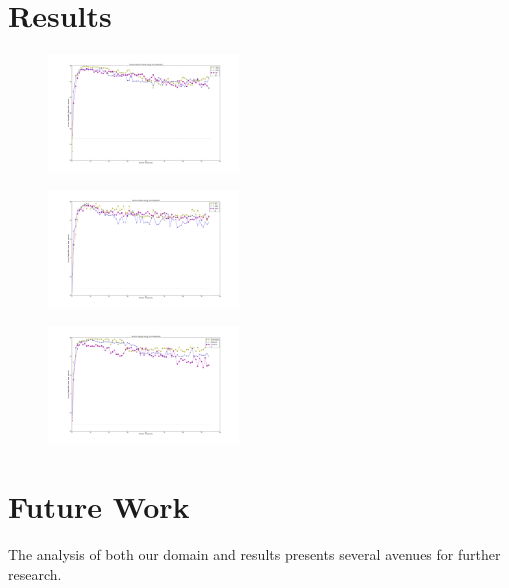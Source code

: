 \documentclass[letterpaper, 10 pt, conference]{ieeeconf}  %
\begin{document}
\section{Results}

\begin{figure}[h!]
    \centering
    \includegraphics[width=0.45\textwidth]{SF_LocalReward.png}
    \caption{}
    \label{fig:}
\end{figure}

\begin{figure}[h!]
    \centering
    \includegraphics[width=0.45\textwidth]{SN_LocalReward.png}
    \caption{ }
    \label{fig:}
\end{figure}

\begin{figure}[h!]
    \centering
    \includegraphics[width=0.45\textwidth]{SR_LocalReward.png}
    \caption{}
    \label{fig:}
\end{figure}

\section{Future Work}
The analysis of both our domain and results presents several avenues for further research.
\end{document}
